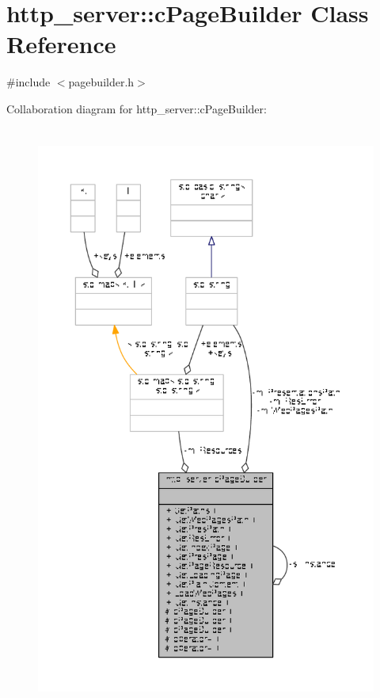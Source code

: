 \hypertarget{classhttp__server_1_1cPageBuilder}{\section{http\-\_\-server\-:\-:c\-Page\-Builder Class Reference}
\label{classhttp__server_1_1cPageBuilder}
}


{\ttfamily \#include $<$pagebuilder.\-h$>$}



Collaboration diagram for http\-\_\-server\-:\-:c\-Page\-Builder\-:
\nopagebreak
\begin{figure}[H]
\begin{center}
\leavevmode
\includegraphics[height=550pt]{classhttp__server_1_1cPageBuilder__coll__graph}
\end{center}
\end{figure}
